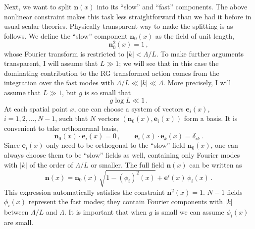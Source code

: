 Next, we want to split $\mathbf n(x)$ into its ``slow'' and ``fast'' components.
The above nonlinear constraint makes this task less straightforward than we had it
before in usual scalar theories. Physically transparent way to make the splitting
is as follows. We define the ``slow'' component $\mathbf n_0(x)$ as the field of
unit length,
\begin{equation}\label{eq:n0unit}
\mathbf n_0^2(x)=1\,,
\end{equation}
whose Fourier transform is restricted to $|k|<\Lambda/L$. To make further
arguments transparent, I will assume that $L\gg1$; we will see that in this case
the dominating contribution to the RG transformed action comes from the
integration over the fast modes with $\Lambda/L\ll|k|\ll\Lambda$. More precisely,
I will assume that $L\gg1$, but $g$ is so small that
\[
g\log L\ll1\,.
\]
At each spatial point $x$, one can choose a system of vectors $\mathbf e_i(x)$,
$i=1,2,\dots,N-1$, such that $N$ vectors $(\mathbf n_0(x),\mathbf e_i(x))$ form a
basis. It is convenient to take orthonormal basis,
\begin{equation}\label{eq:ebasis}
\mathbf n_0(x)\cdot\mathbf e_i(x)=0\,,\qquad\mathbf e_i(x)\cdot\mathbf e_k(x)=\delta_{ik}\,.
\end{equation}
Since $\mathbf e_i(x)$ only need to be orthogonal to the ``slow'' field
$\mathbf n_0(x)$, one can always choose them to be ``slow'' fields as well,
containing only Fourier modes with $|k|$ of the order of $\Lambda/L$ or smaller.
The full field $\mathbf n(x)$ can be written as
\begin{equation}\label{eq:nsplit}
\mathbf n(x)=\mathbf n_0(x)\,\sqrt{1-(\phi_i)^2(x)}+\mathbf e^i(x)\,\phi_i(x)\,.
\end{equation}
This expression automatically satisfies the constraint $\mathbf n^2(x)=1$. $N-1$
fields $\phi_i(x)$ represent the fast modes; they contain Fourier components with
$|k|$ between $\Lambda/L$ and $\Lambda$. It is important that when $g$ is small we
can assume $\phi_i(x)$ are small.

